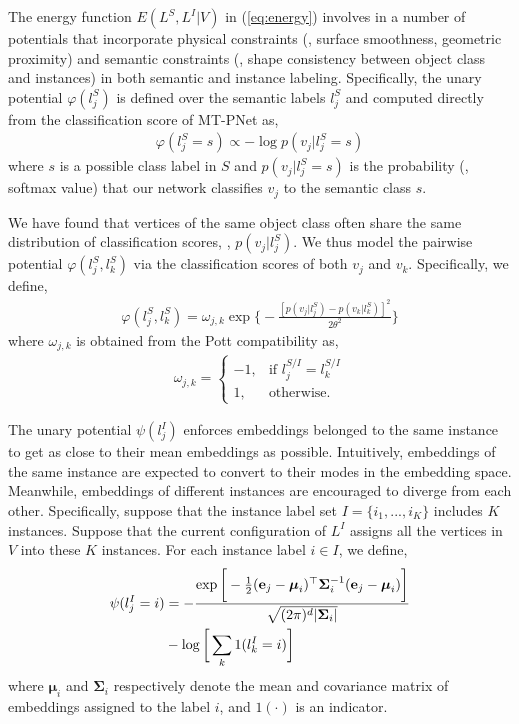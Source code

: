 \documentclass[10pt,twocolumn,letterpaper]{article}
\begin{document}
The energy function $E(L^S,L^I|V)$ in (\ref{eq:energy}) involves in a number of
potentials that incorporate physical constraints (\eg, surface smoothness,
geometric proximity) and semantic constraints (\eg, shape consistency between
object class and instances) in both semantic and instance
labeling. Specifically, the unary potential $\varphi(l^S_j)$ is defined over the
semantic labels $l^S_j$ and computed directly from the classification score of
MT-PNet as,
\begin{align}
  \label{eq:unary/semantic}
  \varphi(l^S_j = s) \propto -\log p(v_j|l^S_j = s)
\end{align}
where $s$ is a possible class label in $S$ and $p(v_j|l^S_j=s)$ is the
probability (\eg, softmax value) that our network classifies $v_j$ to the
semantic class $s$.

We have found that vertices of the same object class often share the same
distribution of classification scores, \ie, $p(v_j|l^S_j)$. We thus model the
pairwise potential $\varphi(l^S_j, l^S_k)$ via the classification scores of both
$v_j$ and $v_k$. Specifically, we define,
\begin{align}
  \label{eq:pairwise/semantic}
  \varphi(l^S_j, l^S_k) = \omega_{j,k} \exp \bigg\{ -\frac{[p(v_j|l^S_j)-p(v_k|l^S_k)]^2}{2\theta^2} \bigg\}
\end{align}
where $\omega_{j,k}$ is obtained from the Pott compatibility as,
\begin{align}
  \label{eq:pott}
  \omega_{j,k} =
  \begin{cases}
    -1, & \mbox{if } l^{S/I}_j = l^{S/I}_k\\
    1, & \mbox{otherwise}.
  \end{cases}
\end{align}

The unary potential $\psi(l^I_j)$ enforces embeddings belonged to the same
instance to get as close to their mean embeddings as possible. Intuitively,
embeddings of the same instance are expected to convert to their modes in the
embedding space. Meanwhile, embeddings of different instances are encouraged to
diverge from each other. Specifically, suppose that the instance label set
$I=\{i_1,...,i_{K}\}$ includes $K$ instances. Suppose that the current
configuration of $L^I$ assigns all the vertices in $V$ into these $K$
instances. For each instance label $i \in I$, we define,
\begin{align}
  \label{eq:unary/instance}
  \psi(l^I_j=i) &= -\frac{\exp\bigg[-\frac{1}{2}(\mathbf{e}_j - \boldsymbol\mu_i)^{\top} \boldsymbol\Sigma_i^{-1}(\mathbf{e}_j - \boldsymbol\mu_i) \bigg]}{\sqrt{(2\pi)^d|\boldsymbol\Sigma_i|}} \notag \\
                &-\log \bigg[ \sum_{k} 1(l^I_k=i) \bigg]
\end{align}
where $\boldsymbol\mu_i$ and $\boldsymbol\Sigma_i$ respectively denote the mean
and covariance matrix of embeddings assigned to the label $i$, and $1(\cdot)$ is
an indicator.
\end{document}
